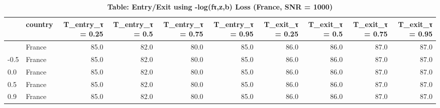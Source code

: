 \begin{table}[t]
\caption*{
{\large \textbf{Table: Entry/Exit using -log(fτ,z,b) Loss (France, SNR = 1000)}}
} 
\begin{tabular*}{\linewidth}{@{\extracolsep{\fill}}l|lrrrrrrrr}
\toprule
 & country & T\_entry\_τ = 0.25 & T\_entry\_τ = 0.5 & T\_entry\_τ = 0.75 & T\_entry\_τ = 0.95 & T\_exit\_τ = 0.25 & T\_exit\_τ = 0.5 & T\_exit\_τ = 0.75 & T\_exit\_τ = 0.95 \\ 
\midrule\addlinespace[2.5pt]
-0.9 & France & 85.0 & 82.0 & 80.0 & 85.0 & 86.0 & 86.0 & 87.0 & 87.0 \\ 
-0.5 & France & 85.0 & 82.0 & 80.0 & 85.0 & 86.0 & 86.0 & 87.0 & 87.0 \\ 
0.0 & France & 85.0 & 82.0 & 80.0 & 85.0 & 86.0 & 86.0 & 87.0 & 87.0 \\ 
0.5 & France & 85.0 & 82.0 & 80.0 & 85.0 & 86.0 & 86.0 & 87.0 & 87.0 \\ 
0.9 & France & 85.0 & 82.0 & 80.0 & 85.0 & 86.0 & 86.0 & 87.0 & 87.0 \\ 
\bottomrule
\end{tabular*}
\end{table}

